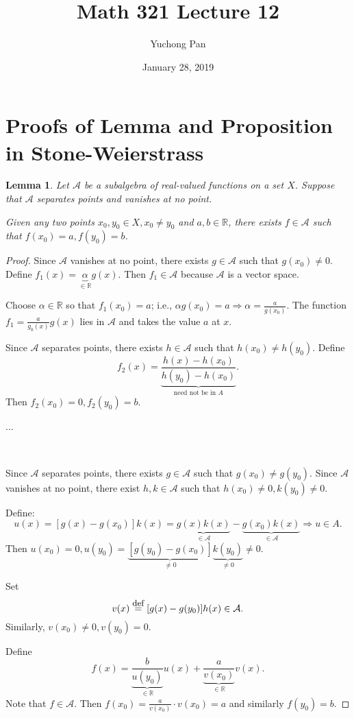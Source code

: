 \documentclass[letterpaper, reqno,11pt]{article}
\newcommand{\RR}{\mathbb{R}}
\begin{document}
\title{Math 321 Lecture 12}
\author{Yuchong Pan}
\date{January 28, 2019}
\newtheorem{thm}{Theorem}
\newtheorem{defn}{Definition}
\newtheorem*{remark}{Remark}
\newtheorem{claim}{Claim}
\newtheorem{cor}{Corollary}
\newtheorem{lemma}{Lemma}
\newtheorem{prop}{Proposition}
\maketitle
%

\section{Proofs of Lemma and Proposition in Stone-Weierstrass}

\begin{lemma}
  \normalfont Let $\mathcal A$ be a subalgebra of real-valued functions on a set $X$. Suppose that $\mathcal A$ separates points and vanishes at no point.

   Given any two points $x_0, y_0 \in X, x_0 \neq y_0$ and $a, b \in \RR$, there exists $f \in \mathcal A$ such that $f(x_0) = a, f(y_0) = b$.
\end{lemma}

\begin{proof}
   Since $\mathcal A$ vanishes at no point, there exists $g \in \mathcal A$ such that $g(x_0) \neq 0$. Define $f_1(x) = \underbrace{\alpha}_{\in \RR} g(x)$. Then $f_1 \in \mathcal A$ because $\mathcal A$ is a vector space.

  Choose $\alpha \in \RR$ so that $f_1(x_0) = a$; i.e., $\alpha g(x_0) = a \Rightarrow \alpha = \frac{a}{g(x_0)}$. The function $f_1 = \frac{a}{g_0(x)} g(x)$ lies in $\mathcal A$ and takes the value $a$ at $x$.

  Since $\mathcal A$ separates points, there exists $h \in \mathcal A$ such that $h(x_0) \neq h(y_0)$. Define
  $$ f_2(x) = \underbrace{\frac{h(x) - h(x_0)}{h(y_0) - h(x_0)}}_\text{need not be in $A$}. $$
  Then $f_2(x_0) = 0, f_2(y_0) = b$.

  ...

  ~

   Since $\mathcal A$ separates points, there exists $g \in \mathcal A$ such that $g(x_0) \neq g(y_0)$. Since $\mathcal A$ vanishes at no point, there exist $h, k \in \mathcal A$ such that $h(x_0) \neq 0, k(y_0) \neq 0$.

  Define:
  $$ u(x) = [g(x) - g(x_0)] k(x) = \underbrace{g(x)k(x)}_{\in \mathcal A} - \underbrace{g(x_0)k(x)}_{\in \mathcal A} \Rightarrow u \in A. $$
  Then $u(x_0) = 0, u(y_0) = \underbrace{[g(y_0) - g(x_0)]}_{\neq 0} \underbrace{k(y_0)}_{\neq 0} \neq 0$.

  Set
  $$ v(x) \overset{\text{\small def}}{=} [g(x) - g(y_0)] h(x) \in \mathcal A. $$
  Similarly, $v(x_0) \neq 0, v(y_0) = 0$.

  Define
  $$ f(x) = \underbrace{\frac{b}{u(y_0)}}_{\in \RR} u(x) + \underbrace{\frac{a}{v(x_0)}}_{\in \RR} v(x). $$
  Note that $f \in \mathcal A$. Then $f(x_0) = \frac{a}{v(x_0)} \cdot v(x_0) = a$ and similarly $f(y_0) = b$.
\end{proof}
\end{document}
